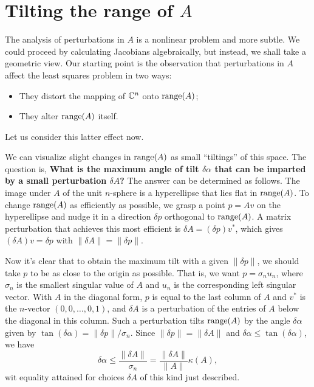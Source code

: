  \section{Tilting the range of $A$} 
 The analysis of perturbations in $A$ is a nonlinear problem and more subtle. We could proceed by calculating Jacobians algebraically, but instead, we shall take a geometric view. Our starting point is the observation that perturbations in $A$ affect the least squares problem in two ways: 
 \begin{itemize}
    \item They distort the mapping of $\mathbb{C}^n$ onto $\operatorname{range}(A)$; 
    \item They alter $\operatorname{range}(A)$ itself. 
 \end{itemize}
Let us consider this latter effect now.  

We can visualize slight changes in $\operatorname{range}(A)$ as small ``tiltings'' of this space. The question is, \textbf{What is the maximum angle of tilt $\delta \alpha $ that can be imparted by a small perturbation $\delta A$?} The answer can be determined as follows.  The image under $A$ of the unit $n$-sphere is a hyperellipse that lies flat in $\operatorname{range}(A)$. To change $\operatorname{range}(A)$ as efficiently as possible, we grasp a point $p=Av$ on the hyperellipse and nudge it in a direction $\delta p$ orthogonal to $\operatorname{range}(A)$. A matrix perturbation that achieves this most efficient is $\delta  A = (\delta p) v^*$,  which gives $(\delta A) v = \delta  p$ with $\|\delta A\| = \|\delta p\|$. 

Now it's clear that to obtain the maximum tilt with a given $\|\delta p\|$, we should take $p$ to be as close to the origin as possible. That is, we want $p=\sigma _n u_n$, where $\sigma _n$ is the smallest singular value of $A$ and $u_n$ is the corresponding left singular vector. With $A$ in the  diagonal form, $p$ is equal to the last column of $A$ and $v^*$ is the $n$-vector $(0,0,\ldots ,0,1)$, and $\delta A$ is a perturbation of the entries of $A$ below the diagonal in this column.  Such a perturbation tilts $\operatorname{range}(A)$ by the angle $\delta \alpha $ given by $\tan (\delta \alpha ) = \|\delta p\|/ \sigma _n$. Since $\|\delta p\| = \|\delta A\|$ and $\delta \alpha  \le \tan (\delta \alpha )$, we have 
\begin{equation}
    \label{eq: delta alpah to delta a}
    \delta \alpha  \le \frac{\|\delta A\|}{\sigma _n}= \frac{\|\delta A\|}{\|A\|} \kappa (A), 
\end{equation}
wit equality attained for choices $\delta A$ of this kind just described.  

